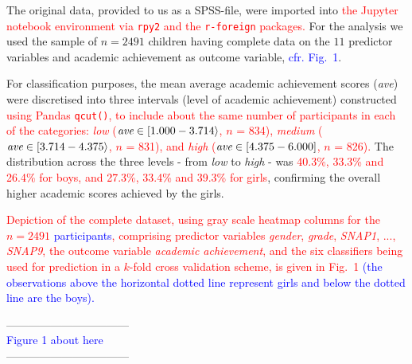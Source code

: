 \documentclass[10pt,letterpaper]{article}
\begin{document}
The original data, provided to us as a SPSS-file, were imported into \textcolor{red}{the Jupyter notebook environment via {\tt rpy2} and the {\tt r-foreign} packages.} 
For the analysis we used the sample of  $n=2491$ children having complete data 
on the $11$ predictor variables and academic achievement as outcome variable, \textcolor{blue}{cfr. Fig.~1}.

 For classification purposes, the mean average academic achievement scores (\emph{ave}) were discretised into three intervals (level of academic achievement) constructed
 \textcolor{red}{using Pandas {\tt qcut()}, to include about the same number of participants in each of the categories:  
{\it low} (${\text{\it ave}} \in [1.000 - 3.714\rangle$,  $n$ = 834),
{\it medium} (${\text{\it ave}} \in [3.714 - 4.375\rangle$, $n$ = 831), and
{\it high} (${\text{\it ave}} \in [4.375 - 6.000]$, $n$ = 826). }
The distribution across the three levels - from {\it low} to {\it high} - was 
\textcolor{red}{40.3\%, 33.3\% and 26.4\% for boys, and 27.3\%, 33.4\% and 39.3\% for girls}, 
confirming the overall higher academic scores achieved by the girls. 

\textcolor{red}{Depiction of the complete dataset,  using gray scale heatmap columns for the $n=2491$  \textcolor{blue}{participants}, comprising predictor variables {\it gender}, {\it grade}, 
{\it SNAP1}, ..., {\it SNAP9}, the outcome variable {\it academic achievement}, and the
 six classifiers being used for prediction in a $k$-fold cross validation scheme, is given in Fig.~1} \textcolor{blue}{(the observations above the horizontal dotted line represent girls and below the dotted line are the boys).}
 
 \vspace{3mm}
 
 \begin{center}
 ---------------------------------\\
 
 \textcolor{blue}{Figure 1 about here} \\
 
  ---------------------------------\\
  \end{center}
  
  \vspace{3mm}
  
 
\end{document}
